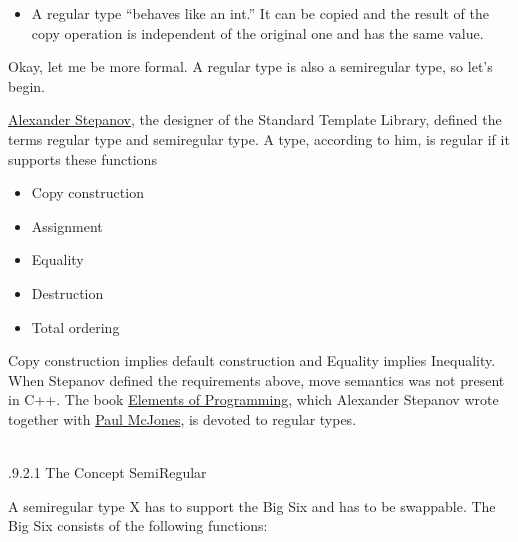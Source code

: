 \begin{itemize}
\item 
A regular type “behaves like an int.” It can be copied and the result of the copy operation is independent of the original one and has the same value.
\end{itemize}

Okay, let me be more formal. A regular type is also a semiregular type, so let’s begin.


\begin{tcolorbox}[breakable,enhanced jigsaw,colback=blue!5!white,colframe=blue!75!black,title=Regular Types]

\href{https://en.wikipedia.org/wiki/Alexander_Stepanov}{Alexander Stepanov}, the designer of the Standard Template Library, defined the terms regular type and semiregular type. A type, according to him, is regular if it supports these functions

\begin{itemize}
\item 
Copy construction

\item 
Assignment

\item 
Equality

\item 
Destruction

\item 
Total ordering
\end{itemize}

Copy construction implies default construction and Equality implies Inequality. When Stepanov defined the requirements above, move semantics was not present in C++. The book \href{http://elementsofprogramming.com/}{Elements of Programming}, which Alexander Stepanov wrote together with \href{https://www.mcjones.org/paul/}{Paul McJones}, is devoted to regular types.

\end{tcolorbox}

\hspace*{\fill} \\ %
.9.2.1\hspace{0.2cm} The Concept SemiRegular

A semiregular type X has to support the Big Six and has to be swappable. The Big Six consists of the following functions:

